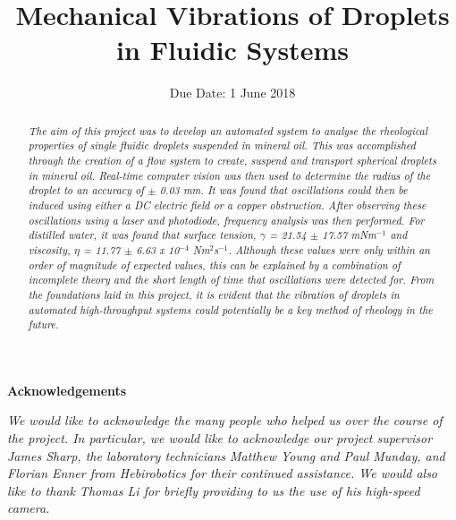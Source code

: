 \documentclass{physics_article_B}
\title{Mechanical Vibrations of Droplets in Fluidic Systems}
\date{Due Date: 1 June 2018}
\begin{document}
    
\setcounter{page}{0}

\newpage
\newpage
\thispagestyle{empty}
\mbox{}
\newpage

\setcounter{page}{1}
\begin{abstract}
    \large{\textit{The aim of this project was to develop an automated system to analyse the rheological properties of single fluidic droplets suspended in mineral oil. This was accomplished through the creation of a flow system to create, suspend and transport spherical droplets in mineral oil. Real-time computer vision was then used to determine the radius of the droplet to an accuracy of $\pm$ 0.03 mm. It was found that oscillations could then be induced using either a DC electric field or a copper obstruction. After observing these oscillations using a laser and photodiode, frequency analysis was then performed. For distilled water, it was found that surface tension, $\gamma$ = 21.54 $\pm$ 17.57 mNm$^{-1}$ and viscosity, $\eta$ = 11.77 $\pm$ 6.63 x 10$^{-4}$ Nm$^{2}$s$^{-1}$. Although these values were only within an order of magnitude of expected values, this can be explained by a combination of incomplete theory and the short length of time that oscillations were detected for. From the foundations laid in this project, it is evident that the vibration of droplets in automated high-throughput systems could potentially be a key method of rheology in the future.}}
\end{abstract}

\begin{center}
\vspace{0.4cm}
{\Large\bf{Acknowledgements}} \\
\end{center}

\begin{changemargin}{1cm}{1cm} 
\textit{We would like to acknowledge the many people who helped us over the course of the project. In particular, we would like to acknowledge our project supervisor James Sharp, the laboratory technicians Matthew Young and Paul Munday, and Florian Enner from Hebirobotics for their continued assistance. We would also like to thank Thomas Li for briefly providing to us the use of his high-speed camera.}


\end{changemargin}
\vspace*{\fill}
\end{document}
